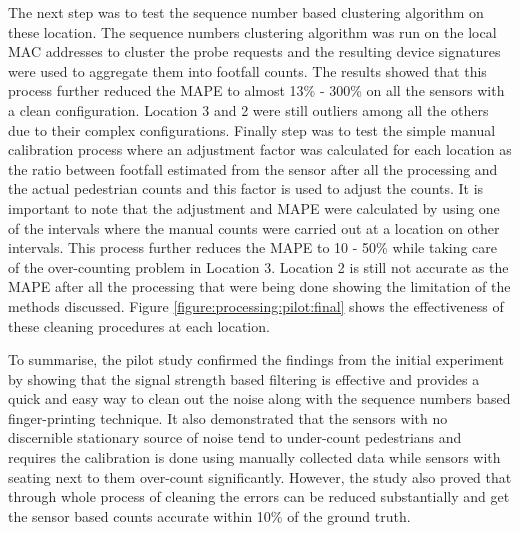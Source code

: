 The next step was to test the sequence number based clustering algorithm on these location. 
The sequence numbers clustering algorithm was run on the local MAC addresses to cluster the probe requests and the resulting device signatures were used to aggregate them into footfall counts. 
The results showed that this process further reduced the MAPE to almost 13\% - 300\% on all the sensors with a clean configuration.
Location 3 and 2 were still outliers among all the others due to their complex configurations. Finally step was to test the simple manual calibration process where an adjustment factor was calculated for each location as the ratio between footfall estimated from the sensor after all the processing and the actual pedestrian counts and this factor is used to adjust the counts.
It is important to note that the adjustment and MAPE were calculated by using one of the intervals where the manual counts were carried out at a location on other intervals.
This process further reduces the MAPE to 10 - 50\% while taking care of the over-counting problem in Location 3.
Location 2 is still not accurate as the MAPE after all the processing that were being done showing the limitation of the methods discussed.
Figure \ref{figure:processing:pilot:final} shows the effectiveness of these cleaning procedures at each location.

To summarise, the pilot study confirmed the findings from the initial experiment by showing that the signal strength based filtering is effective and provides a quick and easy way to clean out the noise along with the sequence numbers based finger-printing technique.
It also demonstrated that the sensors with no discernible stationary source of noise tend to under-count pedestrians and requires the calibration is done using manually collected data while sensors with seating next to them over-count significantly.
However, the study also proved that through whole process of cleaning the errors can be reduced substantially and get the sensor based counts accurate within 10\% of the ground truth.


